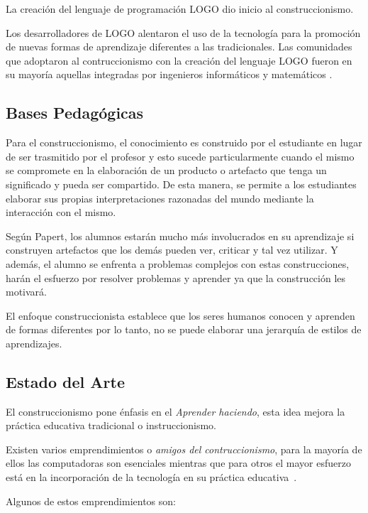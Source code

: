 La creación del lenguaje de programación LOGO dio inicio al construccionismo.

Los desarrolladores de LOGO alentaron el uso de la tecnología para la promoción
de nuevas formas de aprendizaje diferentes a las tradicionales. Las comunidades
que adoptaron al contruccionismo con la creación del lenguaje LOGO fueron en su
mayoría aquellas integradas por ingenieros informáticos y matemáticos
\cite{historia:2014}.

\subsection{Bases Pedagógicas}

Para el construccionismo, el conocimiento es construido por el estudiante en
lugar de ser trasmitido por el profesor\cite{moses:2003} y esto sucede
particularmente cuando el mismo se compromete en la elaboración de un producto o
artefacto que tenga un significado y pueda ser compartido\cite{valdivia:sg}. De
esta manera, se permite a los estudiantes elaborar sus propias interpretaciones
razonadas del mundo mediante la interacción con el mismo.

Según Papert, los alumnos estarán mucho más involucrados en su aprendizaje si
construyen artefactos que los demás pueden ver, criticar y tal vez utilizar. Y
además, el alumno se enfrenta a problemas complejos con estas construcciones,
harán el esfuerzo por resolver problemas y aprender ya que la construcción les
motivará\cite{const:vs}.

El enfoque construccionista establece que los seres humanos conocen y aprenden
de formas diferentes por lo tanto, no se puede elaborar una jerarquía de estilos
de aprendizajes\cite{valdivia:sg}.

\subsection{Estado del Arte}

El construccionismo pone énfasis en el \emph{Aprender haciendo}, esta idea
mejora la práctica educativa tradicional o instruccionismo. 

Existen varios emprendimientos o \emph{amigos del contruccionismo}, para la
mayoría de ellos las computadoras son esenciales mientras que para otros el
mayor esfuerzo está en la incorporación de la tecnología en su práctica
educativa~\cite{papertian:const}.

Algunos de estos emprendimientos son:

